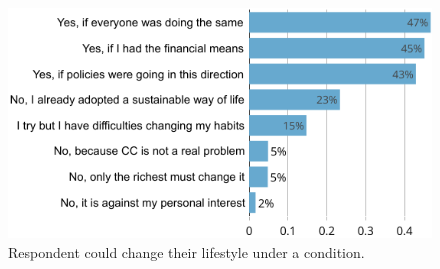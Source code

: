 \documentclass[english,5p,authoryear]{elsarticle}
\begin{document}
    

\begin{figure}[t]
\centering
\includegraphics[width=\columnwidth]{Images/change_if_no.png}
\caption{Respondent could change their lifestyle under a condition.}
\label{fig:condition}
\end{figure}
\end{document}
